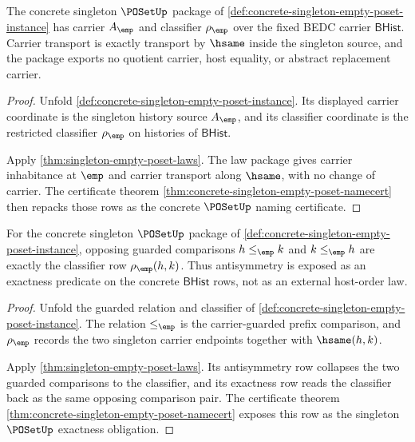 \begin{theorem}
\label{thm:poset-carrier-classifier-obligation}
The concrete singleton $\POSetUp$ package of
\autoref{def:concrete-singleton-empty-poset-instance} has carrier
$A_{\emp}$ and classifier $\rho_{\emp}$ over the fixed BEDC carrier
$\mathsf{BHist}$. Carrier transport is exactly transport by $\hsame$ inside the
singleton source, and the package exports no quotient carrier, host equality,
or abstract replacement carrier.
\end{theorem}
\begin{proof}
Unfold \autoref{def:concrete-singleton-empty-poset-instance}. Its displayed
carrier coordinate is the singleton history source $A_{\emp}$, and its
classifier coordinate is the restricted classifier $\rho_{\emp}$ on histories
of $\mathsf{BHist}$.

Apply \autoref{thm:singleton-empty-poset-laws}. The law package gives carrier
inhabitance at $\emp$ and carrier transport along $\hsame$, with no change of
carrier. The certificate theorem
\autoref{thm:concrete-singleton-empty-poset-namecert} then repacks those rows
as the concrete $\POSetUp$ naming certificate.
\end{proof}

\begin{theorem}
\label{thm:poset-antisymmetry-exactness-obligation}
For the concrete singleton $\POSetUp$ package of
\autoref{def:concrete-singleton-empty-poset-instance}, opposing guarded
comparisons $h\le_{\emp}k$ and $k\le_{\emp}h$ are exactly the classifier row
$\rho_{\emp}(h,k)$. Thus antisymmetry is exposed as an exactness predicate on
the concrete $\mathsf{BHist}$ rows, not as an external host-order law.
\end{theorem}
\begin{proof}
Unfold the guarded relation and classifier of
\autoref{def:concrete-singleton-empty-poset-instance}. The relation
$\le_{\emp}$ is the carrier-guarded prefix comparison, and $\rho_{\emp}$
records the two singleton carrier endpoints together with $\hsame(h,k)$.

Apply \autoref{thm:singleton-empty-poset-laws}. Its antisymmetry row collapses
the two guarded comparisons to the classifier, and its exactness row reads the
classifier back as the same opposing comparison pair. The certificate theorem
\autoref{thm:concrete-singleton-empty-poset-namecert} exposes this row as the
singleton $\POSetUp$ exactness obligation.
\end{proof}

